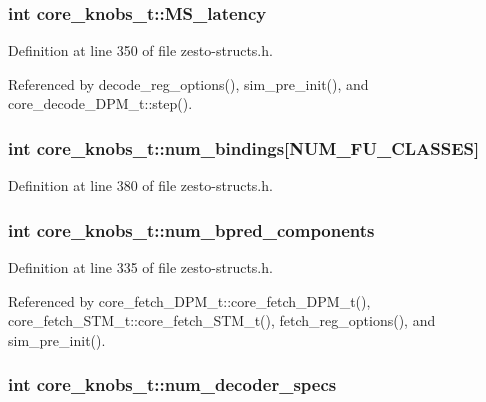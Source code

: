 \subsubsection[{MS\_\-latency}]{\setlength{\rightskip}{0pt plus 5cm}int {\bf core\_\-knobs\_\-t::MS\_\-latency}}\label{structcore__knobs__t_11221d13b1478222871a40bcb9b597da}




Definition at line 350 of file zesto-structs.h.

Referenced by decode\_\-reg\_\-options(), sim\_\-pre\_\-init(), and core\_\-decode\_\-DPM\_\-t::step().
\subsubsection[{num\_\-bindings}]{\setlength{\rightskip}{0pt plus 5cm}int {\bf core\_\-knobs\_\-t::num\_\-bindings}[NUM\_\-FU\_\-CLASSES]}\label{structcore__knobs__t_ff2ef576503a4fcd57f314a365826f84}




Definition at line 380 of file zesto-structs.h.
\subsubsection[{num\_\-bpred\_\-components}]{\setlength{\rightskip}{0pt plus 5cm}int {\bf core\_\-knobs\_\-t::num\_\-bpred\_\-components}}\label{structcore__knobs__t_55f4c8ed9d852752439e9aeb5327cb28}




Definition at line 335 of file zesto-structs.h.

Referenced by core\_\-fetch\_\-DPM\_\-t::core\_\-fetch\_\-DPM\_\-t(), core\_\-fetch\_\-STM\_\-t::core\_\-fetch\_\-STM\_\-t(), fetch\_\-reg\_\-options(), and sim\_\-pre\_\-init().
\subsubsection[{num\_\-decoder\_\-specs}]{\setlength{\rightskip}{0pt plus 5cm}int {\bf core\_\-knobs\_\-t::num\_\-decoder\_\-specs}}\label{structcore__knobs__t_ed005388842df3298f60271dd48f3540}




